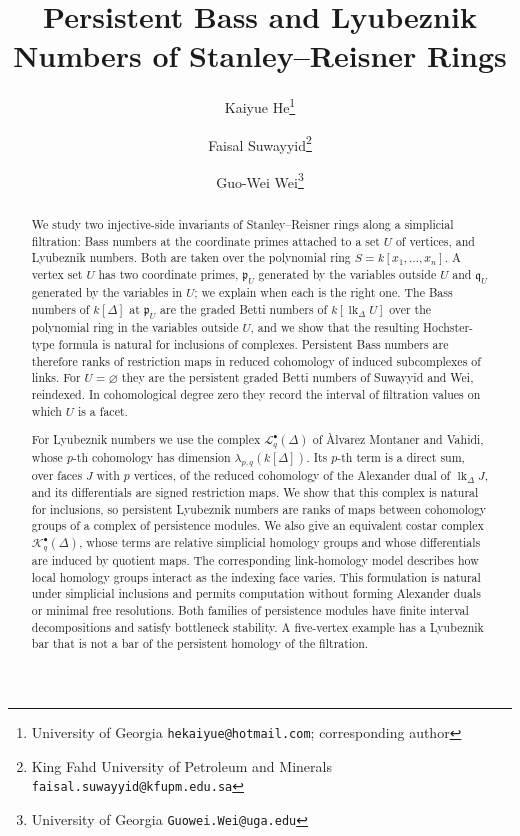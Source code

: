 \documentclass[11pt]{article}
\title{Persistent Bass and Lyubeznik Numbers of Stanley--Reisner Rings}
\author{Kaiyue He\thanks{University of Georgia \texttt{hekaiyue@hotmail.com}; corresponding author}
  \and Faisal Suwayyid\thanks{King Fahd University of Petroleum and Minerals \texttt{faisal.suwayyid@kfupm.edu.sa}}
  \and Guo-Wei Wei\thanks{University of Georgia \texttt{Guowei.Wei@uga.edu}}}
\date{}
\theoremstyle{plain}
\theoremstyle{definition}
\newcommand{\kk}{k}
\newcommand{\pp}{\mathfrak{p}}
\newcommand{\link}{\operatorname{lk}}
\newcommand{\Lc}{\mathcal L}
\newcommand{\Kc}{\mathcal K}
\begin{document}
\maketitle

\begin{abstract}
We study two injective-side invariants of Stanley--Reisner rings along a simplicial filtration:
Bass numbers at the coordinate primes attached to a set $U$ of vertices, and Lyubeznik numbers. Both are
taken over the polynomial ring $S=\kk[x_1,\dots,x_n]$. A vertex set $U$ has two coordinate primes, $\pp_U$
generated by the variables outside $U$ and $\mathfrak q_U$ generated by the variables in $U$; we explain when
each is the right one. The Bass numbers of $\kk[\Delta]$ at $\pp_U$ are the graded Betti numbers of
$\kk[\link_\Delta U]$ over the polynomial ring in the variables outside $U$, and we show that the resulting
Hochster-type formula is natural for inclusions of complexes. Persistent Bass numbers are therefore
ranks of restriction maps in reduced cohomology of induced subcomplexes of links. For $U=\varnothing$
they are the persistent graded Betti numbers of Suwayyid and Wei, reindexed. In cohomological degree
zero they record the interval of filtration values on which $U$ is a facet. 

For Lyubeznik numbers we use the complex $\Lc^\bullet_q(\Delta)$ of \`Alvarez Montaner
and Vahidi, whose $p$-th cohomology has dimension $\lambda_{p,q}(\kk[\Delta])$. Its $p$-th
term is a direct sum, over faces $J$ with $p$ vertices, of the reduced cohomology of the
Alexander dual of $\link_\Delta J$, and its differentials are signed restriction maps. We
show that this complex is natural for inclusions, so persistent Lyubeznik numbers are ranks of maps between cohomology groups of
a complex of persistence modules. We also give an equivalent costar complex $\Kc_q^\bullet(\Delta)$, whose terms are relative simplicial homology groups and whose differentials are induced by quotient maps. The corresponding link-homology model describes how local homology groups interact as the indexing face varies. This formulation is natural under simplicial inclusions and permits computation without forming Alexander duals or minimal free resolutions. Both families of persistence
modules have finite interval
decompositions and satisfy bottleneck stability. A five-vertex example has a Lyubeznik bar that is
not a bar of the persistent homology of the filtration.
\end{abstract}

\tableofcontents
\end{document}
